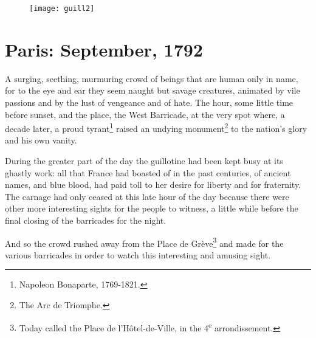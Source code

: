 \documentclass[paper=a5,BCOR=7mm,twoside,DIV=calc,12pt,usegeometry,chapterprefix,endperiod,headings=big]{scrbook}
\newcommand{\moderatelyhuge}{\fontsize{50}{60}\selectfont}
\renewcommand*{\chaptermarkformat}{}
\renewcommand*{\chaptermarkformat}{%

\chapapp~\thechapter\autodot\enskip}
\begin{document}

\renewcommand*{\chapterpagestyle}{empty}


\tableofcontents
\thispagestyle{empty}
\clearpage
\begin{figure}[p!]
\centering
\texttt{[image: guill2]}
\label{guillotine}
\end{figure}
\thispagestyle{empty}
\clearpage


\pagestyle{headings}
\renewcommand*{\chapterpagestyle}{plain}


\renewcommand*{\chaptermarkformat}{}

\chapter{Paris: September, 1792}
\lettrine[lines=4]{A}{} surging, seething, murmuring crowd of beings that are human only in name, for to the eye and ear they seem naught but savage creatures, animated by vile passions and by the lust of vengeance and of hate. The hour, some little time before sunset, and the place, the West Barricade, at the very spot where, a decade later, a proud tyrant\footnote{Napoleon Bonaparte, 1769-1821.} raised an undying monument\footnote{The Arc de Triomphe.} to the nation's glory and his own vanity.

During the greater part of the day the guillotine had been kept busy at its ghastly work: all that France had boasted of in the past centuries, of ancient names, and blue blood, had paid toll to her desire for liberty and for fraternity. The carnage had only ceased at this late hour of the day because there were other more interesting sights for the people to witness, a little while before the final closing of the barricades for the night.

And so the crowd rushed away from the Place de Grève\footnote{Today called the Place de l'Hôtel-de-Ville, in the 4\textsuperscript{e} arrondissement.} and made for the various barricades in order to watch this interesting and amusing sight.
\end{document}
